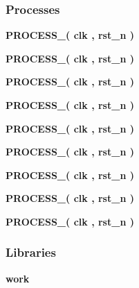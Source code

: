 \subsubsection*{Processes}
 \begin{DoxyCompactItemize}
\item 
{\bf P\+R\+O\+C\+E\+S\+S\+\_}{\bfseries  ( {\bfseries {\bfseries {\bf clk}} \textcolor{vhdlchar}{ }} , {\bfseries {\bfseries {\bf rst\+\_\+n}} \textcolor{vhdlchar}{ }} )}
\item 
{\bf P\+R\+O\+C\+E\+S\+S\+\_}{\bfseries  ( {\bfseries {\bfseries {\bf clk}} \textcolor{vhdlchar}{ }} , {\bfseries {\bfseries {\bf rst\+\_\+n}} \textcolor{vhdlchar}{ }} )}
\item 
{\bf P\+R\+O\+C\+E\+S\+S\+\_}{\bfseries  ( {\bfseries {\bfseries {\bf clk}} \textcolor{vhdlchar}{ }} , {\bfseries {\bfseries {\bf rst\+\_\+n}} \textcolor{vhdlchar}{ }} )}
\item 
{\bf P\+R\+O\+C\+E\+S\+S\+\_}{\bfseries  ( {\bfseries {\bfseries {\bf clk}} \textcolor{vhdlchar}{ }} , {\bfseries {\bfseries {\bf rst\+\_\+n}} \textcolor{vhdlchar}{ }} )}
\item 
{\bf P\+R\+O\+C\+E\+S\+S\+\_}{\bfseries  ( {\bfseries {\bfseries {\bf clk}} \textcolor{vhdlchar}{ }} , {\bfseries {\bfseries {\bf rst\+\_\+n}} \textcolor{vhdlchar}{ }} )}
\item 
{\bf P\+R\+O\+C\+E\+S\+S\+\_}{\bfseries  ( {\bfseries {\bfseries {\bf clk}} \textcolor{vhdlchar}{ }} , {\bfseries {\bfseries {\bf rst\+\_\+n}} \textcolor{vhdlchar}{ }} )}
\item 
{\bf P\+R\+O\+C\+E\+S\+S\+\_}{\bfseries  ( {\bfseries {\bfseries {\bf clk}} \textcolor{vhdlchar}{ }} , {\bfseries {\bfseries {\bf rst\+\_\+n}} \textcolor{vhdlchar}{ }} )}
\item 
{\bf P\+R\+O\+C\+E\+S\+S\+\_}{\bfseries  ( {\bfseries {\bfseries {\bf clk}} \textcolor{vhdlchar}{ }} , {\bfseries {\bfseries {\bf rst\+\_\+n}} \textcolor{vhdlchar}{ }} )}
\item 
{\bf P\+R\+O\+C\+E\+S\+S\+\_}{\bfseries  ( {\bfseries {\bfseries {\bf clk}} \textcolor{vhdlchar}{ }} , {\bfseries {\bfseries {\bf rst\+\_\+n}} \textcolor{vhdlchar}{ }} )}
\end{DoxyCompactItemize}
\subsubsection*{Libraries}
 \begin{DoxyCompactItemize}
\item 
{\bf work} 
\end{DoxyCompactItemize}
